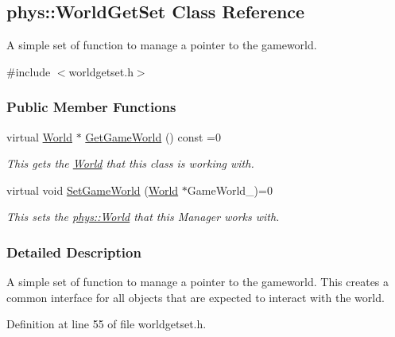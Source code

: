 \hypertarget{classphys_1_1WorldGetSet}{
\subsection{phys::WorldGetSet Class Reference}
\label{dc/d4f/classphys_1_1WorldGetSet}
}


A simple set of function to manage a pointer to the gameworld.  




{\ttfamily \#include $<$worldgetset.h$>$}

\subsubsection*{Public Member Functions}
\begin{DoxyCompactItemize}
\item 
virtual \hyperlink{classphys_1_1World}{World} $\ast$ \hyperlink{classphys_1_1WorldGetSet_ae11f48a9152834423647ea44e7fd7ee5}{GetGameWorld} () const =0
\begin{DoxyCompactList}\small\item\em This gets the \hyperlink{classphys_1_1World}{World} that this class is working with. \item\end{DoxyCompactList}\item 
\hypertarget{classphys_1_1WorldGetSet_a03f596502ff3436f249169833ae7f9c6}{
virtual void \hyperlink{classphys_1_1WorldGetSet_a03f596502ff3436f249169833ae7f9c6}{SetGameWorld} (\hyperlink{classphys_1_1World}{World} $\ast$GameWorld\_\-)=0}
\label{dc/d4f/classphys_1_1WorldGetSet_a03f596502ff3436f249169833ae7f9c6}

\begin{DoxyCompactList}\small\item\em This sets the \hyperlink{classphys_1_1World}{phys::World} that this Manager works with. \item\end{DoxyCompactList}\end{DoxyCompactItemize}


\subsubsection{Detailed Description}
A simple set of function to manage a pointer to the gameworld. This creates a common interface for all objects that are expected to interact with the world. 

Definition at line 55 of file worldgetset.h.



